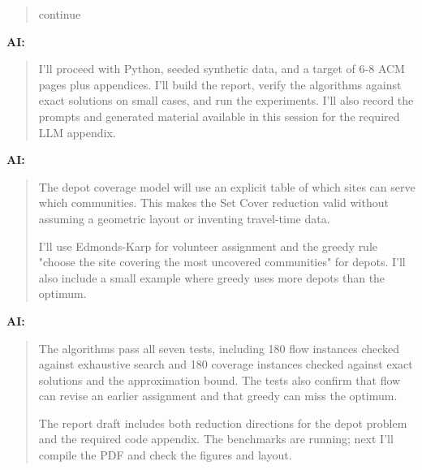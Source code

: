 \begin{quote}\small\raggedright

continue\par

\end{quote}

\par\medskip\noindent\textbf{AI:}\par

\begin{quote}\small\raggedright

I'll proceed with Python, seeded synthetic data, and a target of 6-8 ACM pages plus appendices. I'll build the report, verify the algorithms against exact solutions on small cases, and run the experiments. I'll also record the prompts and generated material available in this session for the required LLM appendix.\par

\end{quote}

\par\medskip\noindent\textbf{AI:}\par

\begin{quote}\small\raggedright

The depot coverage model will use an explicit table of which sites can serve which communities. This makes the Set Cover reduction valid without assuming a geometric layout or inventing travel-time data.\par
I'll use Edmonds-Karp for volunteer assignment and the greedy rule "choose the site covering the most uncovered communities" for depots. I'll also include a small example where greedy uses more depots than the optimum.\par

\end{quote}

\par\medskip\noindent\textbf{AI:}\par

\begin{quote}\small\raggedright

The algorithms pass all seven tests, including 180 flow instances checked against exhaustive search and 180 coverage instances checked against exact solutions and the approximation bound. The tests also confirm that flow can revise an earlier assignment and that greedy can miss the optimum.\par
The report draft includes both reduction directions for the depot problem and the required code appendix. The benchmarks are running; next I'll compile the PDF and check the figures and layout.\par

\end{quote}

